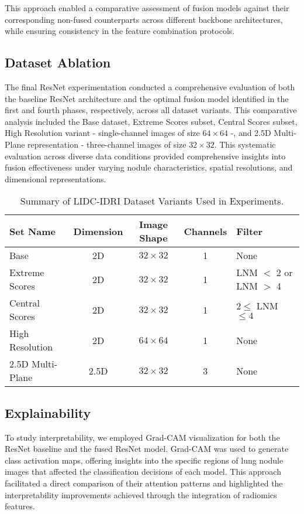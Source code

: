 This approach enabled a comparative assessment of fusion models against their corresponding non-fused counterparts across different backbone architectures, while ensuring consistency in the feature combination protocols.



\subsection{Dataset Ablation}

The final ResNet experimentation conducted a comprehensive evaluation of both the baseline ResNet architecture and the optimal fusion model identified in the first and fourth phases, respectively, across all dataset variants. This comparative analysis included the Base dataset, Extreme Scores subset, Central Scores subset, High Resolution variant - single-channel images of size $64 \times 64$ -, and 2.5D Multi-Plane representation - three-channel images of size $32\times32$. This systematic evaluation across diverse data conditions provided comprehensive insights into fusion effectiveness under varying nodule characteristics, spatial resolutions, and dimensional representations.


\begin{table}[htbp]
\centering
\caption{Summary of LIDC-IDRI Dataset Variants Used in Experiments.}
\begin{tabular}{lcccl}
        \toprule
        \textbf{Set Name} & \textbf{Dimension} & \textbf{Image Shape} & \textbf{Channels} & \textbf{Filter} \\
        \midrule
        Base & 2D   & $32 \times 32$    & 1 & None \\
        Extreme Scores & 2D & $32 \times 32$    & 1 & LNM $<$ 2 or LNM $>$ 4 \\
        Central Scores  & 2D & $32 \times 32$    & 1 & $2 \leq$ LNM $\leq 4$ \\
        High Resolution & 2D & $64 \times 64$    & 1 & None \\
        2.5D Multi-Plane & 2.5D & $32 \times 32$    & 3 & None \\
        \bottomrule
    \end{tabular}
    \label{tab:dataset_variants}
\end{table}

\FloatBarrier

\subsection{Explainability}
To study interpretability, we employed Grad-CAM visualization for both the ResNet baseline and the fused ResNet model. Grad-CAM was used to generate class activation maps, offering insights into the specific regions of lung nodule images that affected the classification decisions of each model. This approach facilitated a direct comparison of their attention patterns and highlighted the interpretability improvements achieved through the integration of radiomics features.

